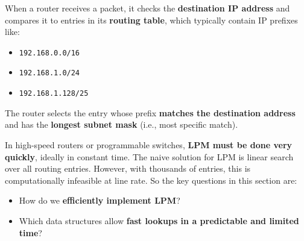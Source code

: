 \highspace
When a router receives a packet, it checks the \textbf{destination IP address} and compares it to entries in its \textbf{routing table}, which typically contain IP prefixes like:
\begin{itemize}
    \item \texttt{192.168.0.0/16}
    \item \texttt{192.168.1.0/24}
    \item \texttt{192.168.1.128/25}
\end{itemize}
The router selects the entry whose prefix \textbf{matches the destination address} and has the \textbf{longest subnet mask} (i.e., most specific match).

\highspace
In high-speed routers or programmable switches, \textbf{LPM must be done very quickly}, ideally in constant time. The naive solution for LPM is linear search over all routing entries. However, with thousands of entries, this is computationally infeasible at line rate. So the key questions in this section are:
\begin{itemize}
    \item How do we \textbf{efficiently implement LPM}?
    \item Which data structures allow \textbf{fast lookups in a predictable and limited time}?
\end{itemize}